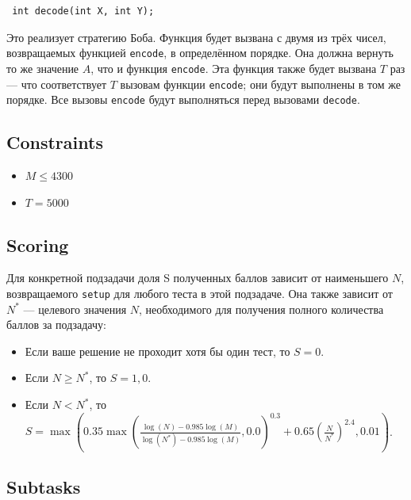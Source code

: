 \documentclass[12pt]{article}
\begin{document}
\begin{lstlisting}
 int decode(int X, int Y);
\end{lstlisting}

Это реализует стратегию Боба. Функция будет вызвана с двумя из трёх чисел, возвращаемых функцией \texttt{encode}, в определённом порядке. Она должна вернуть то же значение $A$, что и функция \texttt{encode}. Эта функция также будет вызвана $T$  раз — что соответствует $T$ вызовам функции \texttt{encode}; они будут выполнены в том же порядке. Все вызовы \texttt{encode} будут выполняться перед вызовами \texttt{decode}.

\subsection{Constraints}

\begin{itemize}
\item $M \leq 4300$
\item $T = 5000$
\end{itemize}

\subsection{Scoring}

Для конкретной подзадачи доля S полученных баллов зависит от наименьшего $N$, возвращаемого \texttt{setup} для любого теста в этой подзадаче. Она также зависит от $N^*$ — целевого значения $N$, необходимого для получения полного количества баллов за подзадачу:

\begin{itemize}
\item Если ваше решение не проходит хотя бы один тест, то $S = 0$.
\item Если $N \geq N^*$, то $S = 1,0$.
\item Если $N < N^*$, то $S = \max\left(0.35 \max\left(\frac{\log(N) - 0.985 \log(M)}{\log(N^*) - 0.985 \log(M)}, 0.0\right)^{0.3} + 0.65 \left(\frac{N}{N^*}\right)^{2.4}, 0.01\right)$.
\end{itemize}

\subsection{Subtasks}
\end{document}
